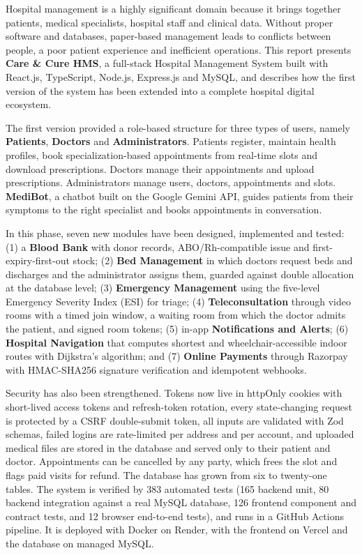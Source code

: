 Hospital management is a highly significant domain because it brings together patients, medical specialists, hospital staff and clinical data. Without proper software and databases, paper-based management leads to conflicts between people, a poor patient experience and inefficient operations. This report presents \textbf{Care \& Cure HMS}, a full-stack Hospital Management System built with React.js, TypeScript, Node.js, Express.js and MySQL, and describes how the first version of the system has been extended into a complete hospital digital ecosystem.

The first version provided a role-based structure for three types of users, namely \textbf{Patients}, \textbf{Doctors} and \textbf{Administrators}. Patients register, maintain health profiles, book specialization-based appointments from real-time slots and download prescriptions. Doctors manage their appointments and upload prescriptions. Administrators manage users, doctors, appointments and slots. \textbf{MediBot}, a chatbot built on the Google Gemini API, guides patients from their symptoms to the right specialist and books appointments in conversation.

In this phase, seven new modules have been designed, implemented and tested: (1) a \textbf{Blood Bank} with donor records, ABO/Rh-compatible issue and first-expiry-first-out stock; (2) \textbf{Bed Management} in which doctors request beds and discharges and the administrator assigns them, guarded against double allocation at the database level; (3) \textbf{Emergency Management} using the five-level Emergency Severity Index (ESI) for triage; (4) \textbf{Teleconsultation} through video rooms with a timed join window, a waiting room from which the doctor admits the patient, and signed room tokens; (5) in-app \textbf{Notifications and Alerts}; (6) \textbf{Hospital Navigation} that computes shortest and wheelchair-accessible indoor routes with Dijkstra's algorithm; and (7) \textbf{Online Payments} through Razorpay with HMAC-SHA256 signature verification and idempotent webhooks.

Security has also been strengthened. Tokens now live in httpOnly cookies with short-lived access tokens and refresh-token rotation, every state-changing request is protected by a CSRF double-submit token, all inputs are validated with Zod schemas, failed logins are rate-limited per address and per account, and uploaded medical files are stored in the database and served only to their patient and doctor. Appointments can be cancelled by any party, which frees the slot and flags paid visits for refund. The database has grown from six to twenty-one tables. The system is verified by 383 automated tests (165 backend unit, 80 backend integration against a real MySQL database, 126 frontend component and contract tests, and 12 browser end-to-end tests), and runs in a GitHub Actions pipeline. It is deployed with Docker on Render, with the frontend on Vercel and the database on managed MySQL.
